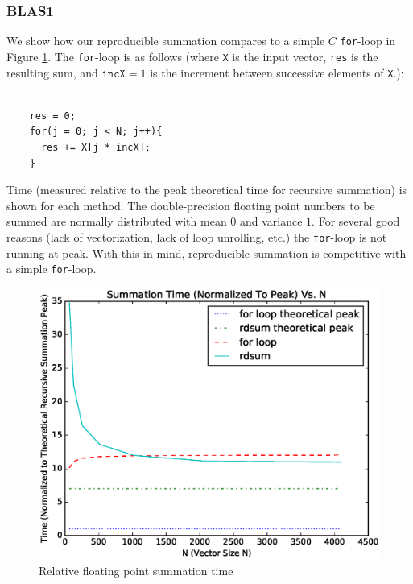   \subsubsection{BLAS1}

    We show how our reproducible summation compares to a simple $C$ \texttt{for}-loop in Figure \ref{fig:forloop_timings}. The \texttt{for}-loop is as follows (where \texttt{X} is the input vector, \texttt{res} is the resulting sum, and $\texttt{incX} = 1$ is the increment between successive elements of \texttt{X}.):
    \begin{lstlisting}

    res = 0;
    for(j = 0; j < N; j++){
      res += X[j * incX];
    }
    \end{lstlisting}

  Time (measured relative to the peak theoretical time for recursive summation) is shown for each method. The double-precision floating point numbers to be summed are normally distributed with mean $0$ and variance $1$. For several good reasons (lack of vectorization, lack of loop unrolling, etc.) the \texttt{for}-loop is not running at peak. With this in mind, reproducible summation is competitive with a simple \texttt{for}-loop.
  \begin{figure}[H]
  \begin{center}
  \includegraphics[width=\textwidth]{plots/sum_comparison}
  \caption{Relative floating point summation time}
  \label{fig:forloop_timings}
  \end{center}
  \end{figure}
